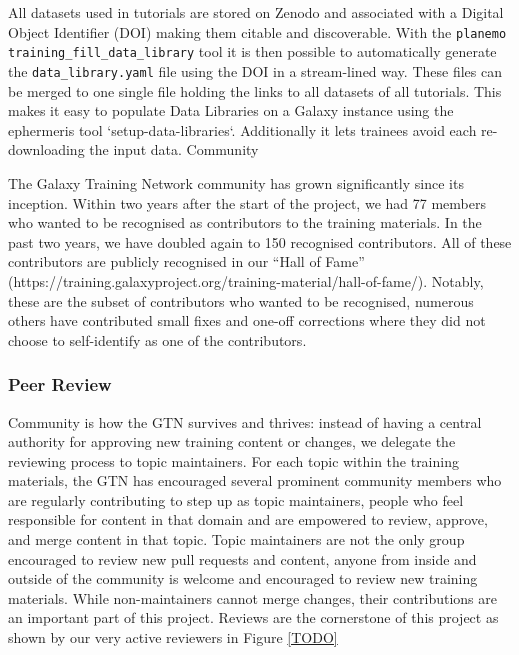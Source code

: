 \documentclass[10pt,letterpaper]{article}
\begin{document}
All datasets used in tutorials are stored on Zenodo and associated with a Digital Object Identifier (DOI) making them citable and discoverable.
With the \verb+planemo training_fill_data_library+ tool it is then possible to automatically generate the \verb+data_library.yaml+ file using the DOI in a stream-lined way.
These files can be merged to one single file holding the links to all datasets of all tutorials.
This makes it easy to populate Data Libraries on a Galaxy instance using the ephermeris tool `setup-data-libraries`.
Additionally it lets trainees avoid each re-downloading the input data.
Community

The Galaxy Training Network community has grown significantly since its inception. Within two years after the start of the project, we had 77 members who wanted to be recognised as contributors to the training materials.
In the past two years, we have doubled again to 150 recognised contributors.
All of these contributors are publicly recognised in our “Hall of Fame” (https://training.galaxyproject.org/training-material/hall-of-fame/).
Notably, these are the subset of contributors who wanted to be recognised, numerous others have contributed small fixes and one-off corrections where they did not choose to self-identify as one of the contributors.

\subsubsection*{Peer Review}
Community is how the GTN survives and thrives: instead of having a central authority for approving new training content or changes, we delegate the reviewing process to topic maintainers.
For each topic within the training materials, the GTN has encouraged several prominent community members who are regularly contributing to step up as topic maintainers, people who feel responsible for content in that domain and are empowered to review, approve, and merge content in that topic.
Topic maintainers are not the only group encouraged to review new pull requests and content, anyone from inside and outside of the community is welcome and encouraged to review new training materials.
While non-maintainers cannot merge changes, their contributions are an important part of this project. Reviews are the cornerstone of this project as shown by our very active reviewers in Figure \ref{TODO}
\end{document}
